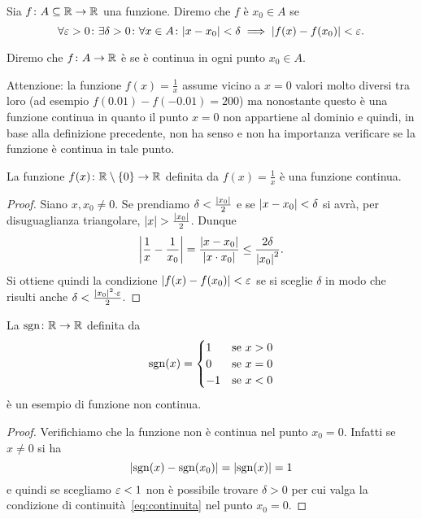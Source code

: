 \begin{definition}[continuità su $\RR$]
\label{def:continua}%
%
%
Sia $f\colon A \subseteq \mathbb R \to \mathbb R$ una funzione. Diremo che
$f$ è  $x_0\in A$ se
\begin{equation}\label{eq:continuita}
\forall \varepsilon>0 \colon \exists \delta>0 \colon
\forall x\in A\colon
{\left|x-x_0\right|} < \delta \implies {\left|f(x)-f(x_0)\right|} < \varepsilon.
\end{equation}

Diremo che $f\colon A \to \mathbb R$ è  se è continua
in ogni punto $x_0 \in A$.
\end{definition}

Attenzione: la funzione $f(x)=\frac{1}{x}$
assume vicino a $x=0$ valori molto diversi tra loro (ad esempio $f(0.01)-f(-0.01)=200$)
ma nonostante questo è una funzione continua in quanto il punto
$x=0$ non appartiene al dominio e quindi,
in base alla definizione precedente, non ha senso e non ha importanza
verificare se la funzione è continua in tale punto.

\begin{theorem}
\label{th:cont_reciproco}%
La funzione $f(x)\colon \mathbb R\setminus\{0\}\to \mathbb R$ definita
da $f(x)=\frac 1 x$ è una funzione continua.
\end{theorem}
%
\begin{proof}
Siano $x,x_0\neq 0$.
Se prendiamo $\delta < \frac{{\left|x_0\right|}}2$
e se ${\left|x-x_0\right|} < \delta$ si avrà,
per disuguaglianza triangolare,
${\left|x\right|} > \frac{{\left|x_0\right|}}2$. Dunque
\[
{\left|\frac 1 x - \frac 1 {x_0}\right|}
= \frac{{\left|x-x_0\right|}}{{\left|x\cdot x_0\right|}}
\le \frac{2\delta}{{\left|x_0\right|}^2}.
\]
Si ottiene quindi la condizione ${\left|f(x)-f(x_0)\right|}<\varepsilon$
se si sceglie $\delta$ in modo che
risulti anche $\delta < \frac{{\left|x_0\right|}^2\cdot \varepsilon}{2}$.
\end{proof}

\begin{example}
La  $\operatorname{sgn}\colon \mathbb R \to \mathbb R$ definita da
\[
  \operatorname{sgn}(x) = \begin{cases}
  1 & \text{se $x> 0$}\\
  0 & \text{se $x=0$}\\
  -1 & \text{se $x<0$}
  \end{cases}
\]
è un esempio di funzione non continua.
\end{example}
%
\begin{proof}
Verifichiamo che la funzione non è continua
nel punto $x_0=0$.
Infatti se $x\neq 0$ si ha
\[
{\left|\operatorname{sgn}(x)-\operatorname{sgn}(x_0)\right|} = {\left|\operatorname{sgn}(x)\right|} = 1
\]
e quindi se scegliamo $\varepsilon<1$ non è possibile
trovare $\delta>0$ per cui valga la condizione
di continuità~\eqref{eq:continuita}
nel punto $x_0=0$.
\end{proof}

